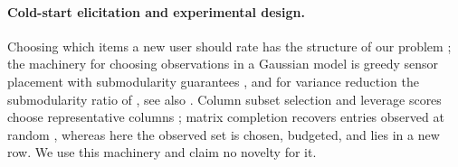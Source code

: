 \paragraph{Cold-start elicitation and experimental design.}
Choosing which items a new user should rate has the structure of our problem \citep{golbandi2011adaptive,elahi2016survey}; the machinery for choosing observations in a Gaussian model is greedy sensor placement with submodularity guarantees \citep{krause2005nonmyopic,krause2008nearoptimal}, and for variance reduction the submodularity ratio of \citet{das2011submodular}, see also \citet{khanna2017scalable}.
Column subset selection and leverage scores choose representative columns \citep{cohen2017input}; matrix completion recovers entries observed at random \citep{candes2009exact,mazumder2010spectral}, whereas here the observed set is chosen, budgeted, and lies in a new row.
We use this machinery and claim no novelty for it.
